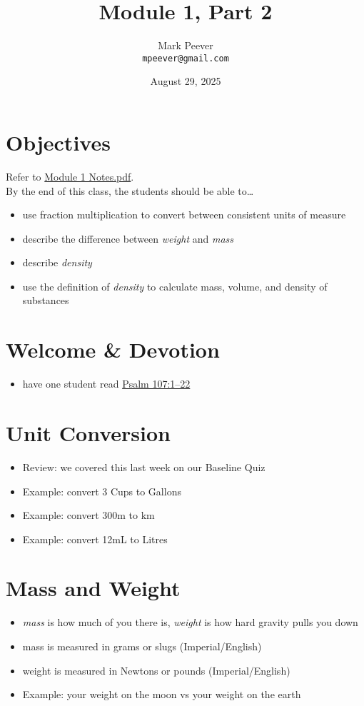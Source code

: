 \documentclass[10pt, oneside]{article}   	%
\title{Module 1, Part 2}
\author{Mark Peever\\ \texttt{mpeever@gmail.com}}
\date{August 29, 2025}
\begin{document}
\maketitle



\section*{Objectives}
Refer to \hyperlink{https://drive.google.com/file/d/1p-i3eBQ1MXrmtNDu9kW5U6uMlN-BSEsR/view?usp=sharing}{Module 1 Notes.pdf}.\\

By the end of this class, the students should be able to\ldots
\begin{itemize}
\item use fraction multiplication to convert between consistent units of measure
\item describe the difference between \emph{weight} and \emph{mass}
\item describe \emph{density}
\item use the definition of \emph{density} to calculate mass, volume, and density of substances
\end{itemize}

\section*{Welcome \& Devotion}
\begin{itemize}
\item have one student read \hyperlink{https://www.biblegateway.com/passage/?search=Psalm\%20107\&version=LSB}{Psalm 107:1--22}
\end{itemize}

\section*{Unit Conversion}
\begin{itemize}
\item Review: we covered this last week on our Baseline Quiz
\item Example: convert 3 Cups to Gallons
\item Example: convert 300m to km
\item Example: convert 12mL to Litres
\end{itemize}

\section*{Mass and Weight}
\begin{itemize}
\item \emph{mass} is how much of you there is, \emph{weight} is how hard gravity pulls you down
\item mass is measured in grams or slugs (Imperial/English)
\item weight is measured in Newtons or pounds (Imperial/English)
\item Example: your weight on the moon vs your weight on the earth 
\end{itemize}
\end{document}
